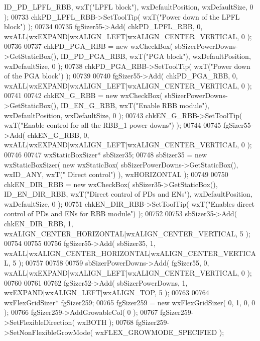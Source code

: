 \begin{DoxyCode}
      ID_PD_LPFL_RBB, wxT(\textcolor{stringliteral}{"LPFL block"}), wxDefaultPosition, wxDefaultSize, 0 );
00733     chkPD_LPFL_RBB->SetToolTip( wxT(\textcolor{stringliteral}{"Power down of the LPFL block"}) );
00734     
00735     fgSizer55->Add( chkPD_LPFL_RBB, 0, wxALL|wxEXPAND|wxALIGN\_LEFT|wxALIGN\_CENTER\_VERTICAL, 0 );
00736     
00737     chkPD_PGA_RBB = \textcolor{keyword}{new} wxCheckBox( sbSizerPowerDowns->GetStaticBox(), 
      ID_PD_PGA_RBB, wxT(\textcolor{stringliteral}{"PGA block"}), wxDefaultPosition, wxDefaultSize, 0 );
00738     chkPD_PGA_RBB->SetToolTip( wxT(\textcolor{stringliteral}{"Power down of the PGA block"}) );
00739     
00740     fgSizer55->Add( chkPD_PGA_RBB, 0, wxALL|wxEXPAND|wxALIGN\_LEFT|wxALIGN\_CENTER\_VERTICAL, 0 );
00741     
00742     chkEN_G_RBB = \textcolor{keyword}{new} wxCheckBox( sbSizerPowerDowns->GetStaticBox(), ID_EN_G_RBB, wxT(\textcolor{stringliteral}{"Enable RBB module"}),
       wxDefaultPosition, wxDefaultSize, 0 );
00743     chkEN_G_RBB->SetToolTip( wxT(\textcolor{stringliteral}{"Enable control for all the RBB\_1 power downs"}) );
00744     
00745     fgSizer55->Add( chkEN_G_RBB, 0, wxALL|wxEXPAND|wxALIGN\_LEFT|wxALIGN\_CENTER\_VERTICAL, 0 );
00746     
00747     wxStaticBoxSizer* sbSizer35;
00748     sbSizer35 = \textcolor{keyword}{new} wxStaticBoxSizer( \textcolor{keyword}{new} wxStaticBox( sbSizerPowerDowns->GetStaticBox(), wxID\_ANY, wxT(\textcolor{stringliteral}{"
      Direct control"}) ), wxHORIZONTAL );
00749     
00750     chkEN_DIR_RBB = \textcolor{keyword}{new} wxCheckBox( sbSizer35->GetStaticBox(), ID_EN_DIR_RBB, wxT(\textcolor{stringliteral}{"Direct control of PDs
       and ENs"}), wxDefaultPosition, wxDefaultSize, 0 );
00751     chkEN_DIR_RBB->SetToolTip( wxT(\textcolor{stringliteral}{"Enables direct control of PDs and ENs for RBB module"}) );
00752     
00753     sbSizer35->Add( chkEN_DIR_RBB, 1, wxALIGN\_CENTER\_HORIZONTAL|wxALIGN\_CENTER\_VERTICAL, 5 );
00754     
00755     
00756     fgSizer55->Add( sbSizer35, 1, wxALL|wxALIGN\_CENTER\_HORIZONTAL|wxALIGN\_CENTER\_VERTICAL, 5 );
00757     
00758     
00759     sbSizerPowerDowns->Add( fgSizer55, 0, wxALL|wxEXPAND|wxALIGN\_LEFT|wxALIGN\_CENTER\_VERTICAL, 0 );
00760     
00761     
00762     fgSizer52->Add( sbSizerPowerDowns, 1, wxEXPAND|wxALIGN\_LEFT|wxALIGN\_TOP, 5 );
00763     
00764     wxFlexGridSizer* fgSizer259;
00765     fgSizer259 = \textcolor{keyword}{new} wxFlexGridSizer( 0, 1, 0, 0 );
00766     fgSizer259->AddGrowableCol( 0 );
00767     fgSizer259->SetFlexibleDirection( wxBOTH );
00768     fgSizer259->SetNonFlexibleGrowMode( wxFLEX\_GROWMODE\_SPECIFIED );

\end{DoxyCode}
